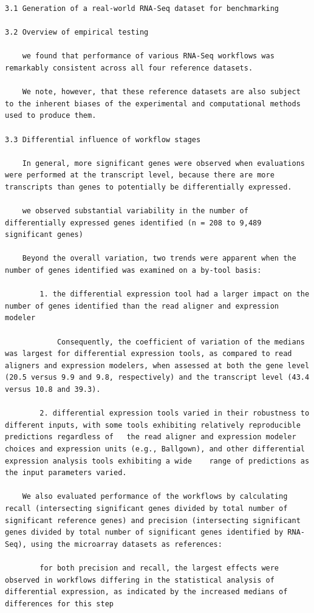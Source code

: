 \documentclass[
]{book}
\begin{document}
\begin{verbatim}
3.1 Generation of a real-world RNA-Seq dataset for benchmarking

3.2 Overview of empirical testing

    we found that performance of various RNA-Seq workflows was remarkably consistent across all four reference datasets.

    We note, however, that these reference datasets are also subject to the inherent biases of the experimental and computational methods used to produce them.

3.3 Differential influence of workflow stages

    In general, more significant genes were observed when evaluations were performed at the transcript level, because there are more transcripts than genes to potentially be differentially expressed.

    we observed substantial variability in the number of differentially expressed genes identified (n = 208 to 9,489 significant genes)

    Beyond the overall variation, two trends were apparent when the number of genes identified was examined on a by-tool basis:

        1. the differential expression tool had a larger impact on the number of genes identified than the read aligner and expression modeler

            Consequently, the coefficient of variation of the medians was largest for differential expression tools, as compared to read aligners and expression modelers, when assessed at both the gene level (20.5 versus 9.9 and 9.8, respectively) and the transcript level (43.4 versus 10.8 and 39.3).

        2. differential expression tools varied in their robustness to different inputs, with some tools exhibiting relatively reproducible predictions regardless of   the read aligner and expression modeler choices and expression units (e.g., Ballgown), and other differential expression analysis tools exhibiting a wide    range of predictions as the input parameters varied.

    We also evaluated performance of the workflows by calculating recall (intersecting significant genes divided by total number of significant reference genes) and precision (intersecting significant genes divided by total number of significant genes identified by RNA-Seq), using the microarray datasets as references:

        for both precision and recall, the largest effects were observed in workflows differing in the statistical analysis of differential expression, as indicated by the increased medians of differences for this step


\end{verbatim}
\end{document}
